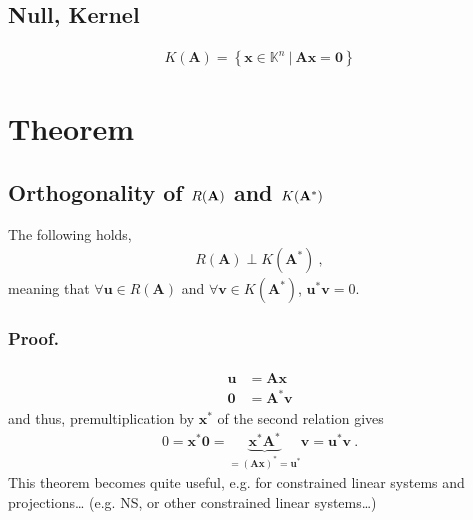 \documentclass[letterpaper,10pt,english]{jupyterBook}
\begin{document}
\subsection{Null, Kernel}
\label{\detokenize{ch/linear-algebra/matrices:null-kernel}}\label{\detokenize{ch/linear-algebra/matrices:math-linear-algebra-matrix-subspaces-null}}\begin{equation*}
\begin{split}K(\mathbf{A}) = \left\{ \mathbf{x} \in \mathbb{K}^n \ | \ \mathbf{A} \mathbf{x} = \mathbf{0} \right\}\end{split}
\end{equation*}

\section{Theorem}
\label{\detokenize{ch/linear-algebra/matrices:theorem}}\label{\detokenize{ch/linear-algebra/matrices:math-linear-algebra-thms}}

\subsection{Orthogonality of \protect\(R(\mathbf{A})\protect\) and \protect\(K(\mathbf{A^*})\protect\)}
\label{\detokenize{ch/linear-algebra/matrices:orthogonality-of-r-mathbf-a-and-k-mathbf-a}}\label{\detokenize{ch/linear-algebra/matrices:math-linear-algebra-thms-raperpkah}}
\sphinxAtStartPar
The following holds,
\begin{equation*}
\begin{split}R(\mathbf{A}) \perp K(\mathbf{A^*}) \ ,\end{split}
\end{equation*}
\sphinxAtStartPar
meaning that \(\forall \mathbf{u} \in R(\mathbf{A})\) and \(\forall \mathbf{v} \in K(\mathbf{A}^*)\), \(\mathbf{u}^* \mathbf{v} = 0\).
\subsubsection*{Proof.}
\begin{equation*}
\begin{split}\begin{aligned}
  \mathbf{u} & = \mathbf{A} \mathbf{x} \\
  \mathbf{0} & = \mathbf{A}^* \mathbf{v} 
\end{aligned}\end{split}
\end{equation*}
\sphinxAtStartPar
and thus, premultiplication by \(\mathbf{x}^*\) of the second relation gives
\begin{equation*}
\begin{split}0 = \mathbf{x}^* \mathbf{0} = \underbrace{\mathbf{x}^* \mathbf{A}^*}_{=(\mathbf{A}  \mathbf{x})^* = \mathbf{u}^*} \mathbf{v} = \mathbf{u}^* \mathbf{v} \ .\end{split}
\end{equation*}
\sphinxAtStartPar
This theorem becomes quite useful, e.g. for constrained linear systems and projections… (e.g. N\sphinxhyphen{}S, or other constrained linear systems…)
\end{document}
